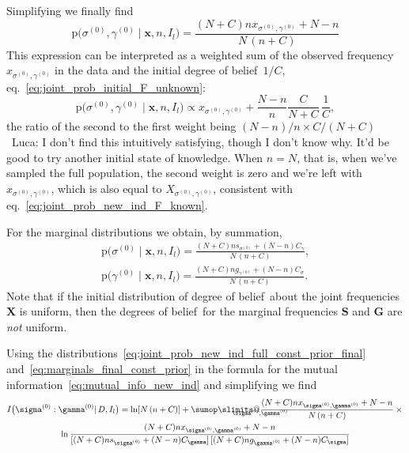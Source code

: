 \documentclass[\ifafour a4paper,12pt,\else a5paper,10pt,\fi%
onecolumn,oneside,article,%
british%
]{memoir}
\makeatletter
\theoremstyle{remark}
\theoremstyle{innote}
\def\sum{\DOTSI\sumop\slimits@}
\newcommand*{\pf}{\mathrm{p}}%
\renewcommand*{\|}{\mathpunct{|}}
\newcommand*{\eqn}{eq.}%
\newcommand*{\puzzle}{\maltese}
\newcommand{\mynote}[1]{ {\color{notecolour}\puzzle\ #1}}
\newcommand*{\dob}{degree of belief}
\newcommand*{\dobs}{degrees of belief}
\newcommand*{\yD}{D}
\newcommand*{\mI}{I}
\newcommand*{\ys}{\sigma}
\newcommand*{\yg}{\gamma}
\newcommand*{\gn}{l}
\newcommand*{\ysi}[1]{\ys^{(#1)}}
\newcommand*{\ygi}[1]{\yg^{(#1)}}
\newcommand*{\yso}{\ysi{0}}
\newcommand*{\ygo}{\ygi{0}}
\newcommand*{\yFs}{\bm{S}}
\newcommand*{\yFg}{\bm{G}}
\newcommand*{\yF}{\bm{X}}
\newcommand*{\yf}{\bm{x}}
\newcommand*{\yCs}{C_{\sigma}}
\newcommand*{\yCg}{C_{\gamma}}
\newcommand*{\yIc}{I_{\gn}}
\makeatother
\begin{document}
Simplifying we finally find
\begin{equation}
    \label{eq:joint_prob_new_ind_full_const_prior_final}
  \pf\bigl(\yso, \ygo \| \yf, n,\yIc\bigr)  =
\frac{(N+C) n x_{\yso, \ygo}+N-n}{N\,(n+C)}
\end{equation}
This expression can be interpreted as a weighted sum of the observed
frequency $x_{\yso,\ygo}$ in the data and the initial \dob\ $1/C$,
\eqn~\eqref{eq:joint_prob_initial_F_unknown}:
\begin{equation}
    \label{eq:joint_prob_new_ind_full_const_prior_final_reinterpret}
  \pf\bigl(\yso, \ygo \| \yf, n,\yIc\bigr)  \propto
x_{\yso, \ygo}+ \frac{N-n}{n}\frac{C}{N+C}\,\frac{1}{C},
\end{equation}
the ratio of the second to the first weight being
$(N-n)/n\times C/(N+C)$\mynote{Luca: I don't find this intuitively
  satisfying, though I don't know why. It'd be good to try another initial
  state of knowledge}. When $n=N$, that is, when we've sampled the full
population, the second weight is zero and we're left with $x_{\yso,\ygo}$,
which is also equal to $X_{\yso,\ygo}$, consistent with
\eqn~\eqref{eq:joint_prob_new_ind_F_known}.

For the marginal distributions we obtain, by summation,
\begin{gather}
  \label{eq:marginals_final_const_prior}
    \pf\bigl(\yso \| \yf, n,\yIc\bigr)  =
\frac{(N+C) n s_{\yso}+(N-n)\yCg}{N\,(n+C)},
\\
    \pf\bigl(\ygo \| \yf, n,\yIc\bigr)  =
\frac{(N+C) n g_{\ygo}+(N-n)\yCs}{N\,(n+C)}.
\end{gather}
Note that if the initial distribution of \dob\ about the joint frequencies
$\yF$ is uniform, then the \dobs\ for the marginal frequencies $\yFs$ and
$\yFg$ are \emph{not} uniform.

Using the
distributions~\eqref{eq:joint_prob_new_ind_full_const_prior_final}
and~\eqref{eq:marginals_final_const_prior} in the formula for the mutual
information~\eqref{eq:mutual_info_new_ind} and simplifying we find
\begin{multline}
  \label{eq:mutual_info_final}
  \mI\bigl( \yso : \ygo \| \yD,\yIc \bigr) =
  \ln[N\,(n+C)] +
  \sum_{\mathclap{\yso,\ygo}}
  \frac{(N+C) n x_{\yso, \ygo}+N-n}{N\,(n+C)}\times{}\\
  \ln\frac{(N+C) n x_{\yso, \ygo}+N-n}{
    [(N+C) n s_{\yso}+(N-n)\yCg]\,
    [(N+C) n g_{\ygo}+(N-n)\yCs]
  }
\end{multline}
\end{document}
